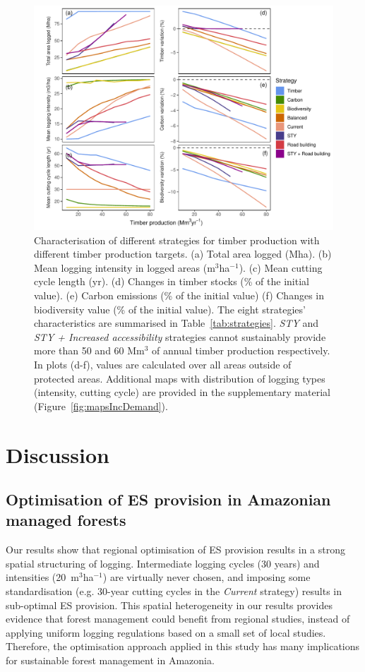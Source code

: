 \documentclass[12pt]{article}
\begin{document}
\begin{figure}
    \centering
    \includegraphics[width=\linewidth]{graphs/increasingDemand.pdf}
    \caption{ Characterisation of different strategies for timber production with different timber production targets. (a) Total area logged (Mha). (b) Mean logging intensity in logged areas (m$^3$ha$^{-1}$). (c) Mean cutting cycle length (yr). (d) Changes in timber stocks (\% of the initial value). (e) Carbon emissions (\% of the initial value) (f) Changes in biodiversity value (\% of the initial value). The eight strategies' characteristics are summarised in Table~\ref{tab:strategies}. \textit{STY} and \textit{STY + Increased accessibility} strategies cannot sustainably provide more than 50 and 60 Mm$^3$ of annual timber production respectively. In plots (d-f), values are calculated over all areas outside of protected areas. Additional maps with distribution of logging types (intensity, cutting cycle) are provided in the supplementary material (Figure~\ref{fig:mapsIncDemand}).
}
    \label{fig:incDemand}
\end{figure}

\section*{Discussion}

\subsection*{Optimisation of ES provision in Amazonian managed forests}

Our results show that regional optimisation of ES provision results in a strong spatial structuring of logging. Intermediate logging cycles (30 years) and intensities (20~m$^3$ha$^{-1}$) are virtually never chosen, and imposing some standardisation (e.g. 30-year cutting cycles in the \textit{Current} strategy) results in sub-optimal ES provision. This spatial heterogeneity in our results provides evidence that forest management could benefit from regional studies, instead of applying uniform logging regulations based on a small set of local studies. Therefore, the optimisation approach applied in this study has many implications for sustainable forest management in Amazonia. 
\end{document}
